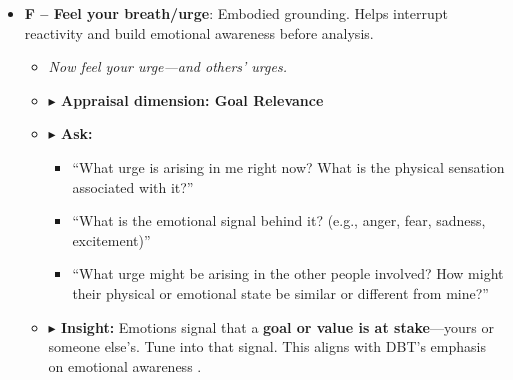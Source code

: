 \documentclass{article}
\begin{document}
\begin{itemize}[noitemsep,topsep=0pt]
    \item \textbf{F – Feel your breath/urge}: Embodied grounding. Helps interrupt reactivity and build emotional awareness before analysis.
    \begin{itemize}[noitemsep,topsep=0pt]
        \item \textit{Now feel your urge—and others’ urges.}
        \item \textbf{$\blacktriangleright$ Appraisal dimension: Goal Relevance}
        \item \textbf{$\blacktriangleright$ Ask:}
        \begin{itemize}[noitemsep,topsep=0pt]
            \item “What urge is arising in me right now? What is the physical sensation associated with it?”
            \item “What is the emotional signal behind it? (e.g., anger, fear, sadness, excitement)”
            \item “What urge might be arising in the other people involved? How might their physical or emotional state be similar or different from mine?”
        \end{itemize}
        \item \textbf{$\blacktriangleright$ Insight:} Emotions signal that a \textbf{goal or value is at stake}—yours or someone else's. Tune into that signal. This aligns with DBT's emphasis on emotional awareness \cite{linehan1993cognitive}.
    \end{itemize}


\end{itemize}
\end{document}
